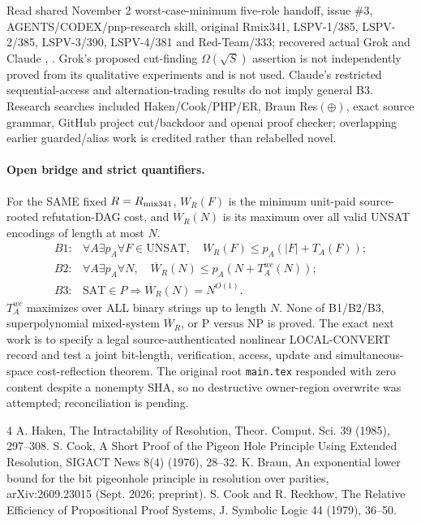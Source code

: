 \documentclass[11pt]{article}
\begin{document}
Read shared November 2 worst-case-minimum five-role handoff, issue \#3, AGENTS/CODEX/pnp-research skill, original Rmix341, LSPV-1/385, LSPV-2/385, LSPV-3/390, LSPV-4/381 and Red-Team/333; recovered actual Grok  and Claude , . Grok's proposed cut-finding $\Omega(\sqrt S)$ assertion is not independently proved from its qualitative experiments and is not used. Claude's restricted sequential-access and alternation-trading results do not imply general B3. Research searches included Haken/Cook/PHP/ER, Braun Res$(\oplus)$, exact source grammar, GitHub project cut/backdoor and openai proof checker; overlapping earlier guarded/alias work is credited rather than relabelled novel.

\paragraph{Open bridge and strict quantifiers.}
For the SAME fixed $R=R_{\rm mix341}$, $W_R(F)$ is the minimum unit-paid source-rooted refutation-DAG cost, and $\overline W_R(N)$ is its maximum over all valid UNSAT encodings of length at most $N$.
\[
\begin{array}{rl}
B1:&\forall A\exists p_A\forall F\in\mathrm{UNSAT},\quad W_R(F)\le p_A(|F|+T_A(F));\\
B2:&\forall A\exists p_A\forall N,\quad \overline W_R(N)\le p_A(N+T_A^{wc}(N));\\
B3:&\mathrm{SAT}\in P\Longrightarrow \overline W_R(N)=N^{O(1)}.
\end{array}
\]
$T_A^{wc}$ maximizes over ALL binary strings up to length $N$. None of B1/B2/B3, superpolynomial mixed-system $\overline W_R$, or P versus NP is proved. The exact next work is to specify a legal source-authenticated nonlinear LOCAL-CONVERT record and test a joint bit-length, verification, access, update and simultaneous-space cost-reflection theorem. The original root \texttt{main.tex} responded with zero content despite a nonempty SHA, so no destructive owner-region overwrite was attempted; reconciliation is pending.

\begin{thebibliography}{4}
 A. Haken, The Intractability of Resolution, Theor. Comput. Sci. 39 (1985), 297--308.
 S. Cook, A Short Proof of the Pigeon Hole Principle Using Extended Resolution, SIGACT News 8(4) (1976), 28--32.
 K. Braun, An exponential lower bound for the bit pigeonhole principle in resolution over parities, arXiv:2609.23015 (Sept. 2026; preprint).
 S. Cook and R. Reckhow, The Relative Efficiency of Propositional Proof Systems, J. Symbolic Logic 44 (1979), 36--50.
\end{thebibliography}
\end{document}
